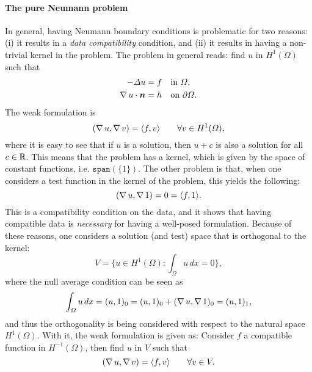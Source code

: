 \paragraph{The pure Neumann problem} In general, having Neumann boundary conditions is problematic for two reasons: (i) it results in a \emph{data compatibility} condition, and (ii) it results in having a non-trivial kernel in the problem. The problem in general reads: find $u$ in $H^1(\Omega)$ such that
\begin{equation}
    \begin{aligned}
        -\Delta u &= f && \text{in $\Omega$},\\
        \grad u \cdot \vec n &= h && \text{on $\partial\Omega$}.
    \end{aligned}
\end{equation}
The weak formulation is 
\begin{equation}
    (\operatorname{\nabla} u, \operatorname{\nabla} v) = \langle f, v \rangle \qquad \forall v\in H^1(\Omega),
\end{equation}
where it is easy to see that if $u$ is a solution, then $u+c$ is also a solution for all $c\in \mathbb{R}$. This means that the problem has a kernel, which is given by the space of constant functions, i.e. $\texttt{span}(\{1\})$. The other problem is that, when one considers a test function in the kernel of the problem, this yields the following: 
\begin{equation}
    (\operatorname{\nabla} u, \operatorname{\nabla} 1) = 0 = \langle f, 1\rangle.
\end{equation}
This is a compatibility condition on the data, and it shows that having compatible data is \emph{necessary} for having a well-posed formulation. Because of these reasons, one considers a solution (and test) space that is orthogonal to the kernel: 
\begin{equation}
    V = \{u\in H^1(\Omega): \int_\Omega u \,dx = 0\},
\end{equation}
where the null average condition can be seen as 
\begin{equation}
    \int_\Omega u \,dx = (u, 1)_0 = (u,1)_0 + (\operatorname{\nabla} u, \operatorname{\nabla} 1)_0 = (u, 1)_1,
\end{equation}
and thus the orthogonality is being considered with respect to the natural space $H^1(\Omega)$. With it, the weak formulation is given as: Consider $f$ a compatible function in $H^{-1}(\Omega)$, then find $u$ in $V$ such that
\begin{equation}
    (\operatorname{\nabla} u, \operatorname{\nabla} v) = \langle f, v\rangle \qquad \forall v\in V.
\end{equation}

